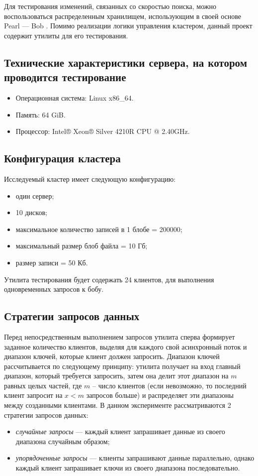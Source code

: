 Для тестирования изменений, связанных со скоростью поиска, можно воспользоваться распределенным хранилищем, использующим в своей основе Pearl --- Bob \cite{bob}. Помимо реализации логики управления кластером, данный проект содержит утилиты для его тестирования.

\subsection{Технические характеристики сервера, на котором проводится тестирование}

\begin{itemize}
	\item Операционная система: Linux \cite{linux} x86\_64.
	\item Память: 64 GiB.
    \item Процессор: Intel® Xeon® Silver 4210R CPU @ 2.40GHz\cite{intel}.
\end{itemize}

\subsection{Конфигурация кластера}

Исследуемый кластер имеет следующую конфигурацию:
\begin{itemize}
    \item один сервер;
    \item 10 дисков;
    \item максимальное количество записей в 1 блобе = 200000;
    \item максимальный размер блоб файла = 10 Гб;
    \item размер записи = 50 Кб.
\end{itemize}

Утилита тестирования будет содержать 24 клиентов, для выполнения одновременных запросов к бобу.

\subsection{Стратегии запросов данных}

Перед непосредственным выполнением запросов утилита сперва формирует заданное количество клиентов, выделяя для каждого свой асинхронный поток и диапазон ключей, которые клиент должен запросить. Диапазон ключей рассчитывается по следующему принципу: утилита получает на вход главный диапазон, который требуется запросить, затем она делит этот диапазон на $m$ равных целых частей, где $m$ -- число клиентов (если невозможно, то последний клиент запросит на $x < m$ запросов больше) и распределяет эти диапазоны между созданными клиентами. В данном эксперименте рассматриваются 2 стратегии запросов данных:
\begin{itemize}
    \item \textit{случайные запросы} --- каждый клиент запрашивает данные из своего диапазона случайным образом;
    \item \textit{упорядоченные запросы} --- клиенты запрашивают данные параллельно, однако каждый клиент запрашивает ключи из своего диапазона последовательно.
\end{itemize}

